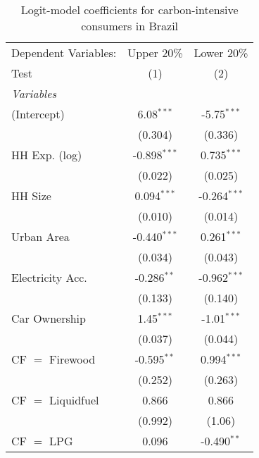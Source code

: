 
\begin{table}[htbp!]
   \centering
   \small
   \begin{adjustbox}{width = 1\textwidth, max height = 0.95\textheight, center}
      \begin{threeparttable}[b]
         \caption{\label{tab:Logit_1_BRA} Logit-model coefficients for carbon-intensive consumers in Brazil}
         \begin{tabular}{lcc}
            \tabularnewline \midrule \midrule
            Dependent Variables:  & Upper 20\%     & Lower 20\%\\   
            Test                  & (1)            & (2)\\  
            \midrule
            \emph{Variables}\\
            (Intercept)           & 6.08$^{***}$   & -5.75$^{***}$\\   
                                  & (0.304)        & (0.336)\\   
            HH Exp. (log)         & -0.898$^{***}$ & 0.735$^{***}$\\   
                                  & (0.022)        & (0.025)\\   
            HH Size               & 0.094$^{***}$  & -0.264$^{***}$\\   
                                  & (0.010)        & (0.014)\\   
            Urban Area            & -0.440$^{***}$ & 0.261$^{***}$\\   
                                  & (0.034)        & (0.043)\\   
            Electricity Acc.      & -0.286$^{**}$  & -0.962$^{***}$\\   
                                  & (0.133)        & (0.140)\\   
            Car Ownership         & 1.45$^{***}$   & -1.01$^{***}$\\   
                                  & (0.037)        & (0.044)\\   
            CF $=$ Firewood       & -0.595$^{**}$  & 0.994$^{***}$\\   
                                  & (0.252)        & (0.263)\\   
            CF $=$ Liquidfuel     & 0.866          & 0.866\\   
                                  & (0.992)        & (1.06)\\   
            CF $=$ LPG            & 0.096          & -0.490$^{**}$\\   

\end{tabular}
\end{threeparttable}
\end{adjustbox}
\end{table}
